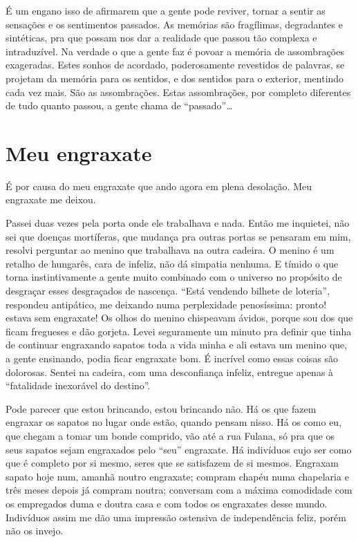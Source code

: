É um engano isso de afirmarem que a gente pode reviver, tornar a sentir
as sensações e os sentimentos passados. As memórias são fragílimas,
degradantes e sintéticas, pra que possam nos dar a realidade que passou
tão complexa e intraduzível. Na verdade o que a gente faz é povoar a
memória de assombrações exageradas. Estes sonhos de acordado,
poderosamente revestidos de palavras, se projetam da memória para os
sentidos, e dos sentidos para o exterior, mentindo cada vez mais. São as
assombrações. Estas assombrações, por completo diferentes de tudo quanto
passou, a gente chama de ``passado''\ldots{}

\chapter{Meu engraxate}

É por causa do meu engraxate que ando agora em plena desolação. Meu
engraxate me deixou.

Passei duas vezes pela porta onde ele trabalhava e nada. Então me
inquietei, não sei que doenças mortíferas, que mudança pra outras portas
se pensaram em mim, resolvi perguntar ao menino que trabalhava na outra
cadeira. O menino é um retalho de hungarês, cara de infeliz, não dá
simpatia nenhuma. E tímido o que torna instintivamente a gente muito
combinado com o universo no propósito de desgraçar esses desgraçados de
nascença. ``Está vendendo bilhete de loteria'', respondeu antipático, me
deixando numa perplexidade penosíssima: pronto! estava sem engraxate! Os
olhos do menino chispeavam ávidos, porque sou dos que ficam fregueses e
dão gorjeta. Levei seguramente um minuto pra definir que tinha de
continuar engraxando sapatos toda a vida minha e ali estava um menino
que, a gente ensinando, podia ficar engraxate bom. É incrível como essas
coisas são dolorosas. Sentei na cadeira, com uma desconfiança infeliz,
entregue apenas à ``fatalidade inexorável do destino''.

Pode parecer que estou brincando, estou brincando não. Há os que fazem
engraxar os sapatos no lugar onde estão, quando pensam nisso. Há os como
eu, que chegam a tomar um bonde comprido, vão até a rua Fulana, só pra
que os seus sapatos sejam engraxados pelo ``seu'' engraxate. Há indivíduos
cujo ser como que é completo por si mesmo, seres que se satisfazem de si
mesmos. Engraxam sapato hoje num, amanhã noutro engraxate; compram
chapéu numa chapelaria e três meses depois já compram noutra; conversam
com a máxima comodidade com os empregados duma e doutra casa e com todos
os engraxates desse mundo. Indivíduos assim me dão uma impressão
ostensiva de independência feliz, porém não os invejo.

